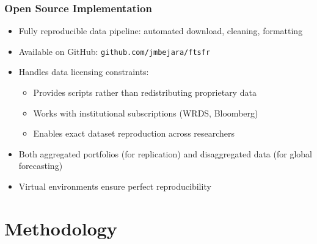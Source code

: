 \documentclass[ignorenonframetext, 9pt]{beamer}
\begin{document}
\begin{frame}
  \frametitle{Open Source Implementation}
  \begin{itemize}
  \item \alert{Fully reproducible} data pipeline: automated download, cleaning, formatting
  \vspace{0.2cm}
  \item Available on GitHub: \texttt{github.com/jmbejara/ftsfr}
  \vspace{0.2cm}
  \item Handles data licensing constraints:
  \begin{itemize}
    \item Provides scripts rather than redistributing proprietary data
    \item Works with institutional subscriptions (WRDS, Bloomberg)
    \item Enables exact dataset reproduction across researchers
  \end{itemize}
  \vspace{0.2cm}
  \item Both \alert{aggregated portfolios} (for replication) and \alert{disaggregated data} (for global forecasting)
  \vspace{0.1cm}
  \item Virtual environments ensure perfect reproducibility
  \end{itemize}
\end{frame}

\section{Methodology}
\end{document}
